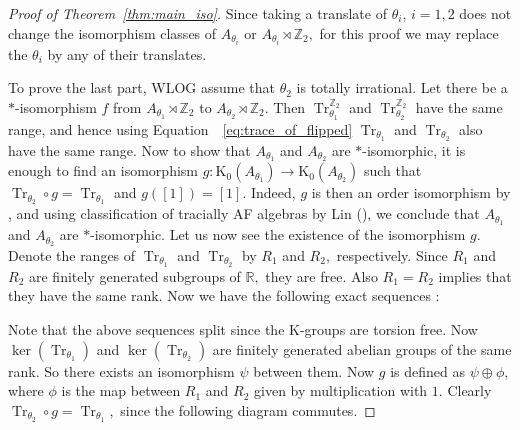 \documentclass[9pt, BCOR=2mm]{amsart}
\numberwithin{equation}{section}
\numberwithin{equation}{section}
\newcommand{\Z}{{\mathbb{Z}}}
\newcommand{\R}{{\mathbb{R}}}
\newcommand{\K}{\mathrm{K}} %
\DeclareMathOperator{\Tr}{Tr}
\begin{document}
\begin{proof}[Proof of Theorem~\ref{thm:main_iso}]

Since taking a translate of $\theta_i$, $i=1,2$ does not change the isomorphism classes of $A_{\theta_i}$ or $A_{\theta_i}\rtimes \Z_2,$ for this proof we may replace the $\theta_i$ by any of their translates. 

To prove the last part, WLOG assume that $\theta_2$ is totally irrational. Let there be a $*$-isomorphism $f$ from $A_{\theta_{1}}\rtimes \Z_2$ to $A_{\theta_{2}}\rtimes \Z_2.$ Then  $\Tr^{\Z_2}_{\theta_{1}}$ and $\Tr^{\Z_2}_{\theta_{2}}$ have the same range, and hence using Equation~~\ref{eq:trace_of_flipped} $\Tr_{\theta_{1}}$ and $\Tr_{\theta_{2}}$ also have the same range. Now to show that $A_{\theta_{1}}$ and $A_{\theta_{2}}$ are $*$-isomorphic, it is enough to find an isomorphism $g: \K_{0}\left(A_{\theta_{1}}\right) \rightarrow \K_{0}\left(A_{\theta_{2}}\right)$ such that $\Tr_{\theta_{2}} \circ g=\Tr_{\theta_{1}}$ and $g([1])=[1].$ Indeed, $g$ is then an order isomorphism by \cite[Proposition 3.7]{BCHL18}, and using classification of tracially AF algebras by Lin (\cite[Theorem 5.2]{Lin04}), we conclude that $A_{\theta_{1}}$ and $A_{\theta_{2}}$ are $*$-isomorphic.
	Let us now see the existence of the isomorphism $g$. Denote the ranges of $\Tr_{\theta_{1}}$ and $\Tr_{\theta_{2}}$ by $R_1$ and $R_2,$ respectively. Since $R_1$ and  $R_2$ are finitely generated subgroups of $\R,$ they are free. Also $R_1 =  R_2$ implies that they have the same rank. Now we have the following exact sequences :
	

\begin{center}

    
    	\end{center}
    	\begin{center}

    
    	\end{center}
Note that the above sequences split since the K-groups are torsion free. Now $\operatorname{ker}\left(\Tr_{\theta_{1}}\right)$ and $\operatorname{ker}\left(\Tr_{\theta_{2}}\right)$ are finitely generated abelian groups of the same rank. So there exists   an isomorphism $\psi$ between them. Now $g$ is defined as $\psi \oplus \phi,$ where $\phi$ is the map between $R_1$ and $R_2$ given by multiplication with $1.$ Clearly $\Tr_{\theta_{2}} \circ g=\Tr_{\theta_{1}},$ since the following diagram commutes. 


\end{proof}
\end{document}
